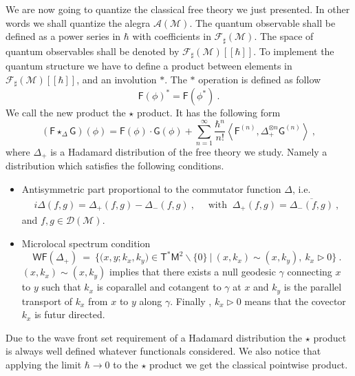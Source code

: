 \documentclass[10pt]{book}
\newcommand{\WF}{\mathsf{WF}}
\newcommand{\sm}[1]{\left\langle#1\right\rangle}
\newcommand{\Acal}{\mathcal{A}}
\newcommand{\Dcal}{\mathcal{D}}
\newcommand{\Fcal}{\mathcal{F}}
\newcommand{\Mcal}{\mathcal{M}}
\newcommand{\Fsf}{\mathsf{F}}
\newcommand{\Gsf}{\mathsf{G}}
\newcommand{\Msf}{\mathsf{M}}
\newcommand{\Tsf}{\mathsf{T}}
\theoremstyle{break}
\begin{document}
We are now going to quantize the classical free theory we just presented. In other words we shall quantize the alegra $\Acal(\Mcal)$. The quantum observable shall be defined as a power series in $\hbar$ with coefficients in $\Fcal_\sharp(\Mcal)$. The space of quantum observables shall be denoted by $\Fcal_\sharp(\Mcal)[[\hbar]]$. To implement the quantum structure we have to define a product between elements in $\Fcal_\sharp(\Mcal)[[\hbar]]$, and an involution $\ast$. The $\ast$ operation is defined as follow
%
\begin{equation*}
\Fsf(\phi)^\ast =  \Fsf(\phi^\ast) \ .
\end{equation*}
%
We call the new product the $\star$ product. It has the following form
%
\begin{equation*}
(\Fsf \star_\Delta \Gsf)(\phi) = \Fsf(\phi) \cdot \Gsf(\phi) + \sum_{n=1}^\infty \frac{\hbar^n}{n!} \sm{ \Fsf^{(n)} , \Delta_+^{\otimes n} \Gsf^{(n) } } \ ,
\end{equation*}
%
where $\Delta_+$ is a Hadamard distribution of the free theory we study. Namely a distribution which satisfies the following conditions.
%
\begin{itemize}
\item Antisymmetric part proportional to the commutator function $\Delta$, i.e. 
%
\begin{eqnarray*}
i \Delta(f,g) = \Delta_+(f,g) - \Delta_-(f,g) \ , \quad \mbox{ with } \ \Delta_+(f,g) = \overline{\Delta_-(f,g)} \ ,
\end{eqnarray*}
%
and $f,g \in \Dcal(\Mcal)$.

\item Microlocal spectrum condition
%
\begin{equation*}
\WF(\Delta_+) \ = \ \bigg\{ \bigg( x, y ; k_x, k_y \bigg) \in \Tsf^\ast\Msf^2 \backslash \{0\} \ \bigg| \ (x,k_x) \sim (x,k_y), \ k_x \triangleright 0 \bigg\} \ .
\label{eq:Hadamard_condition}
\end{equation*}
%
$(x,k_x) \sim (x,k_y)$ implies that there exists a null geodesic $\gamma$ connecting $x$ to $y$ such that $k_x$ is coparallel and cotangent to $\gamma$ at $x$ and $k_y$ is the parallel transport of $k_x$ from $x$ to $y$ along $\gamma$. Finally , $k_x \triangleright 0$ means that the covector $k_x$ is futur directed.

\end{itemize}


Due to the wave front set requirement of a Hadamard distribution the $\star$ product is always well defined whatever functionals considered. We also notice that applying the limit $\hbar \to 0$ to the $\star$ product we get the classical pointwise product.
\end{document}
